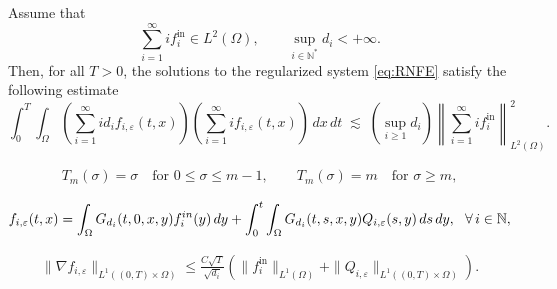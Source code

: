 \documentclass[10pt,a4paper]{amsart}
\begin{document}
	\begin{prop}
		\label{prop:dual_estimate}
		Assume that
		\[
		\sum_{i=1}^{\infty} i f_i^{\mathrm{in}} \in L^2(\Omega),
		\qquad
		\sup_{i\in\mathbb{N}^*} d_i < +\infty.
		\]
		Then, for all $T>0$, the solutions to the regularized system \eqref{eq:RNFE} satisfy the following estimate
		\begin{equation}
			\label{eq:dual_estimate}
			\int_0^T \int_\Omega
			\left( \sum_{i=1}^{\infty} i d_i f_{i,\varepsilon}(t,x) \right)
			\left( \sum_{i=1}^{\infty} i f_{i,\varepsilon}(t,x) \right)
			\,dx\,dt
			\;\lesssim\;
			\left( \sup_{i\ge1} d_i \right)
			\left\|
			\sum_{i=1}^{\infty} i f_i^{\mathrm{in}}
			\right\|_{L^2(\Omega)}^{2}.
		\end{equation}
	\end{prop}

	\begin{align}\label{m_trunction}
		T_m(\sigma)=\sigma \quad \text{for } 0\le \sigma \le m-1,
		\qquad
		T_m(\sigma)=m \quad \text{for } \sigma \ge m,
	\end{align}

		\begin{align}\label{representation regularization}
			f_{i,\varepsilon}(t,x)= \int_{\Omega}G_{d_i}(t,0,x,y)f_i^{\rm{in}}(y)\, dy+\int_{0}^{t}\int_{\Omega} G_{d
				_i}(t,s,x,y)Q_{i,\varepsilon}(s,y) \, ds\, dy, \ \ \forall \, i\in\mathbb{N},
		\end{align}

		\begin{align}\label{gradient estimate:regularization}
			\|\nabla f_{i,\varepsilon}\|_{L^1((0,T)\times\Omega)}
			\le
			\frac{C\sqrt{T}}{\sqrt{d_i}}
			\left(
			\|f_i^{\mathrm{in}}\|_{L^1(\Omega)}
			+
			\|Q_{i,\varepsilon}\|_{L^1((0,T)\times\Omega)}
			\right).
		\end{align}
\end{document}
